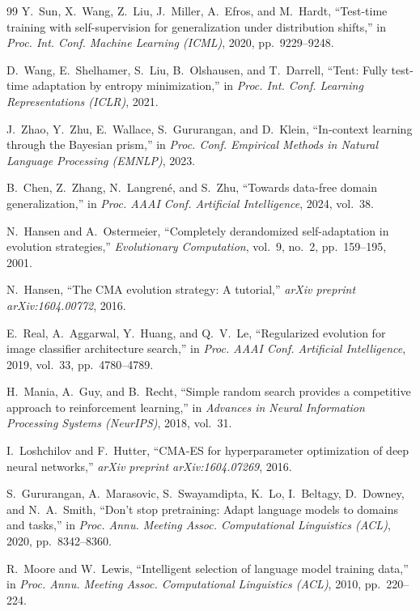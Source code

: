 \documentclass[preprint,12pt]{elsarticle}
\begin{document}
\begin{thebibliography}{99}
Y.~Sun, X.~Wang, Z.~Liu, J.~Miller, A.~Efros, and M.~Hardt,
``Test-time training with self-supervision for generalization under distribution
shifts,'' in \textit{Proc. Int. Conf. Machine Learning (ICML)}, 2020,
pp.~9229--9248.

D.~Wang, E.~Shelhamer, S.~Liu, B.~Olshausen, and T.~Darrell,
``Tent: Fully test-time adaptation by entropy minimization,'' in
\textit{Proc. Int. Conf. Learning Representations (ICLR)}, 2021.

J.~Zhao, Y.~Zhu, E.~Wallace, S.~Gururangan, and D.~Klein,
``In-context learning through the Bayesian prism,'' in
\textit{Proc. Conf. Empirical Methods in Natural Language Processing (EMNLP)},
2023.

B.~Chen, Z.~Zhang, N.~Langrené, and S.~Zhu,
``Towards data-free domain generalization,'' in
\textit{Proc. AAAI Conf. Artificial Intelligence}, 2024, vol.~38.

N.~Hansen and A.~Ostermeier,
``Completely derandomized self-adaptation in evolution strategies,''
\textit{Evolutionary Computation}, vol.~9, no.~2, pp.~159--195, 2001.

N.~Hansen,
``The CMA evolution strategy: A tutorial,''
\textit{arXiv preprint arXiv:1604.00772}, 2016.

E.~Real, A.~Aggarwal, Y.~Huang, and Q.~V.~Le,
``Regularized evolution for image classifier architecture search,'' in
\textit{Proc. AAAI Conf. Artificial Intelligence}, 2019, vol.~33,
pp.~4780--4789.

H.~Mania, A.~Guy, and B.~Recht,
``Simple random search provides a competitive approach to reinforcement
learning,'' in \textit{Advances in Neural Information Processing Systems
(NeurIPS)}, 2018, vol.~31.

I.~Loshchilov and F.~Hutter,
``CMA-ES for hyperparameter optimization of deep neural networks,''
\textit{arXiv preprint arXiv:1604.07269}, 2016.

S.~Gururangan, A.~Marasovic, S.~Swayamdipta, K.~Lo, I.~Beltagy, D.~Downey,
and N.~A.~Smith, ``Don't stop pretraining: Adapt language models to domains
and tasks,'' in \textit{Proc. Annu. Meeting Assoc. Computational Linguistics
(ACL)}, 2020, pp.~8342--8360.

R.~Moore and W.~Lewis,
``Intelligent selection of language model training data,'' in
\textit{Proc. Annu. Meeting Assoc. Computational Linguistics (ACL)}, 2010,
pp.~220--224.


\end{thebibliography}
\end{document}
